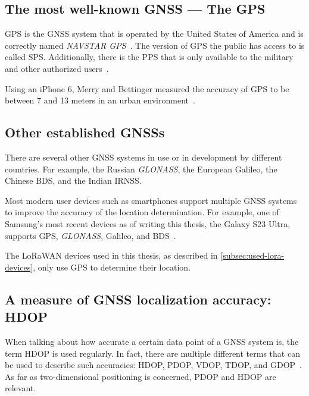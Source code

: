 \subsection{The most well-known \acl{GNSS} — The \acl{GPS}}

\ac{GPS} is the \ac{GNSS} system that is operated by the United States of America and is correctly named \emph{NAVSTAR \ac{GPS}}~\cite{department_of_defense_usa_gps_2020}.
The version of GPS the public has access to is called \acf{SPS}.
Additionally, there is the \acf{PPS} that is only available to the military and other authorized users~\cite{department_of_defense_usa_gps_2007}.

Using an iPhone 6, Merry and Bettinger measured the accuracy of \ac{GPS} to be between 7 and 13 meters in an urban environment~\cite{merry_smartphone_2019}.

\subsection{Other established \aclp{GNSS}}

There are several other \ac{GNSS} systems in use or in development by different countries.
For example, the Russian \emph{GLONASS}, the European Galileo, the Chinese \acf{BDS}, and the Indian \acf{IRNSS}.

Most modern user devices such as smartphones support multiple \ac{GNSS} systems to improve the accuracy of the location determination.
For example, one of Samsung's most recent devices as of writing this thesis, the Galaxy S23 Ultra, supports \ac{GPS}, \emph{GLONASS}, Galileo, and \ac{BDS}~\cite{gsmarena_samsung_2023}.

The \ac{LoRaWAN} devices used in this thesis, as described in \cref{subsec:used-lora-devices}, only use \ac{GPS} to determine their location.

\subsection{A measure of \acl{GNSS} localization accuracy: \acl{HDOP}}

When talking about how accurate a certain data point of a \ac{GNSS} system is, the term \ac{HDOP} is used regularly.
In fact, there are multiple different terms that can be used to describe such accuracies: \ac{HDOP}, \ac{PDOP}, \ac{VDOP}, \ac{TDOP}, and \ac{GDOP}~\cite{langley_dilution_1999}.
As far as two-dimensional positioning is concerned, \ac{PDOP} and \ac{HDOP} are relevant.

